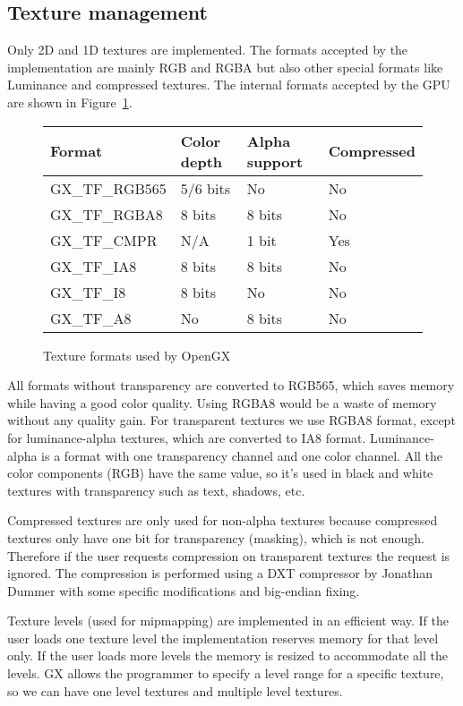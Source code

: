 \documentclass[12pt]{article}
\begin{document}
\subsection {Texture management}

Only 2D and 1D textures are implemented. The formats accepted by the implementation are mainly RGB and RGBA but also other special formats like Luminance and compressed textures. The internal formats accepted by the GPU are shown in Figure~\ref{table:format1}.

\begin{figure}[ht]
\centering

\begin{tabular}{|l|l|l|l|}
\hline
	Format & {Color depth} & {Alpha support} & Compressed \\
\hline
	GX\_TF\_RGB565 & 5/6 bits & No & No\\
\hline
	GX\_TF\_RGBA8  & 8 bits & 8 bits & No\\
\hline
	GX\_TF\_CMPR  & N/A & 1 bit & Yes\\
\hline
	GX\_TF\_IA8  & 8 bits & 8 bits & No \\
\hline
	GX\_TF\_I8  & 8 bits & No & No \\
\hline
	GX\_TF\_A8  & No & 8 bits & No \\
\hline
\end{tabular}
\caption{Texture formats used by OpenGX}
\label{table:format1}
\end {figure}

All formats without transparency are converted to RGB565, which saves memory while having a good color quality. Using RGBA8 would be a waste of memory without any quality gain. For transparent textures we use RGBA8 format, except for luminance-alpha textures, which are converted to IA8 format. Luminance-alpha is a format with one transparency channel and one color channel. All the color components (RGB) have the same value, so it's used in black and white textures with transparency such as text, shadows, etc.

Compressed textures are only used for non-alpha textures because compressed textures only have one bit for transparency (masking), which is not enough. Therefore if the user requests compression on transparent textures the request is ignored. The compression is performed using a DXT compressor by Jonathan Dummer \cite{dxt_cmp} with some specific modifications and big-endian fixing.

Texture levels (used for mipmapping) are implemented in an efficient way. If the user loads one texture level the implementation reserves memory for that level only. If the user loads more levels the memory is resized to accommodate all the levels. GX allows the programmer to specify a level range for a specific texture, so we can have one level textures and multiple level textures.
\end{document}
